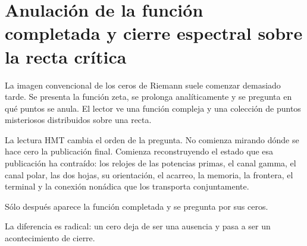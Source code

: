 \section{Anulación de la función completada y cierre espectral sobre la recta crítica}
La imagen convencional de los ceros de Riemann suele comenzar demasiado tarde. Se presenta la función zeta, se prolonga analíticamente y se pregunta en qué puntos se anula. El lector ve una función compleja y una colección de puntos misteriosos distribuidos sobre una recta.\par
La lectura HMT cambia el orden de la pregunta. No comienza mirando dónde se hace cero la publicación final. Comienza reconstruyendo el estado que esa publicación ha contraído: los relojes de las potencias primas, el canal gamma, el canal polar, las dos hojas, su orientación, el acarreo, la memoria, la frontera, el terminal y la conexión nonádica que los transporta conjuntamente.\par
Sólo después aparece la función completada y se pregunta por sus ceros.\par
La diferencia es radical: un cero deja de ser una ausencia y pasa a ser un acontecimiento de cierre.\par
{}
